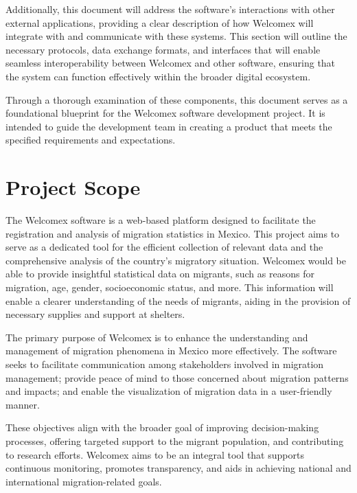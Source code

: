\documentclass{scrreprt}
\begin{document}
Additionally, this document will address the software's interactions with other external applications, providing a clear description of how Welcomex will integrate with and communicate with these systems. This section will outline the necessary protocols, data exchange formats, and interfaces that will enable seamless interoperability between Welcomex and other software, ensuring that the system can function effectively within the broader digital ecosystem.

Through a thorough examination of these components, this document serves as a foundational blueprint for the Welcomex software development project. It is intended to guide the development team in creating a product that meets the specified requirements and expectations.
\section{Project Scope}
The Welcomex software is a web-based platform designed to facilitate the registration and analysis of migration statistics in Mexico. This project aims to serve as a dedicated tool for the efficient collection of relevant data and the comprehensive analysis of the country's migratory situation. Welcomex would be able to provide insightful statistical data on migrants, such as reasons for migration, age, gender, socioeconomic status, and more. This information will enable a clearer understanding of the needs of migrants, aiding in the provision of necessary supplies and support at shelters.

The primary purpose of Welcomex is to enhance the understanding and management of migration phenomena in Mexico more effectively. The software seeks to facilitate communication among stakeholders involved in migration management; provide peace of mind to those concerned about migration patterns and impacts; and enable the visualization of migration data in a user-friendly manner.

These objectives align with the broader goal of improving decision-making processes, offering targeted support to the migrant population, and contributing to research efforts. Welcomex aims to be an integral tool that supports continuous monitoring, promotes transparency, and aids in achieving national and international migration-related goals.
\end{document}
